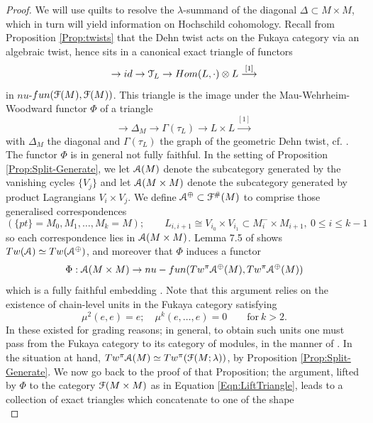 \documentclass[reqno,10pt]{amsart}
\numberwithin{equation}{section}
\newcommand{\scrT}{\EuScript{T}}
\newcommand{\scrF}{\EuScript{F}}
\newcommand{\scrA}{\EuScript{A}}
\theoremstyle{remark}
\begin{document}
\begin{proof}
We will use quilts to resolve the $\lambda$-summand of the diagonal $\Delta \subset M \times M$, which in turn will yield information on Hochschild cohomology.   
Recall from Proposition \ref{Prop:twists} that the Dehn twist acts on the Fukaya category via an algebraic twist, hence sits in a canonical exact triangle of functors
\[
\rightarrow id \rightarrow \scrT_L \rightarrow Hom(L,\cdot)\otimes L \stackrel{[1]}{\longrightarrow}
\]
in $nu$-$fun(\scrF(M),\scrF(M))$.  This triangle is the image under the Mau-Wehrheim-Woodward functor $\Phi$ of a triangle
\begin{equation} \label{Eqn:LiftTriangle}
\rightarrow \Delta_M \rightarrow \Gamma(\tau_L) \rightarrow L\times L \stackrel{[1]}{\longrightarrow}
\end{equation}
with $\Delta_M$ the diagonal and $\Gamma(\tau_L)$ the graph of the geometric Dehn twist, cf. \cite[Theorem 7.2]{WW:triangle}.  The functor $\Phi$ is in general not fully faithful. In the setting of Proposition \ref{Prop:Split-Generate}, we let $\scrA(M)$ denote the subcategory generated by the vanishing cycles $\{V_j\}$ and let $\scrA(M\times M)$ denote the subcategory generated by product Lagrangians $V_i \times V_j$.  We define $\scrA^{\oplus} \subset \scrF^{\#}(M)$ to comprise those generalised correspondences
\[
(\{pt\}=M_0, M_1,\ldots, M_k=M); \qquad L_{i,i+1} \cong V_{i_0} \times V_{i_1} \subset M_i^-\times M_{i+1}, \ 0\leq i\leq k-1
\]
so each correspondence lies in $\scrA(M\times M)$. Lemma 7.5 of \cite{Abouzaid-Smith} shows $Tw(\scrA) \simeq Tw(\scrA^{\oplus})$, and moreover that  $\Phi$ induces a functor
\[
\Phi: \scrA(M \times M) \rightarrow nu\-- fun(Tw^{\pi}\scrA^{\oplus}(M),Tw^{\pi}\scrA^{\oplus}(M))
\]
which is a fully faithful embedding \cite[Lemma 7.8]{Abouzaid-Smith}. Note that this argument relies on the existence of chain-level units in the Fukaya category satisfying 
\[
\mu^2(e,e) = e; \quad \mu^k(e,\ldots,e) = 0 \qquad \textrm{for} \ k>2.
\] In \cite{Abouzaid-Smith} these existed for grading reasons; in general, to obtain such units one must pass from the Fukaya category to its category of modules, in the manner of \cite[Section 4]{Abouzaid}.
 In the situation at hand, $Tw^{\pi}\scrA(M) \simeq Tw^{\pi}(\scrF(M;\lambda))$, by Proposition \ref{Prop:Split-Generate}.  We now go back to the proof of that Proposition;  the argument, lifted by $\Phi$ to the category $\scrF(M\times M)$ as in Equation \ref{Eqn:LiftTriangle}, leads to a collection of exact triangles which concatenate to one of the shape
\[
\]
\end{proof}
\end{document}
